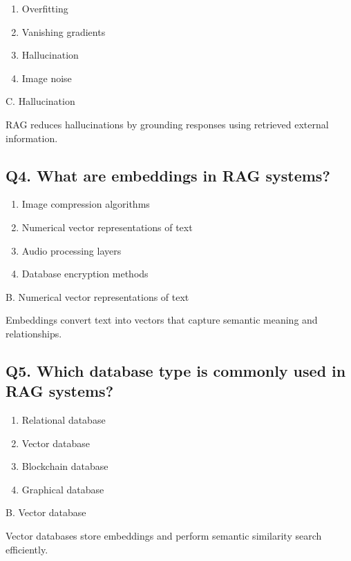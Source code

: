 \documentclass[12pt,a4paper]{article}
\begin{document}
\begin{enumerate}[label=\Alph*.]
\item Overfitting
\item Vanishing gradients
\item Hallucination
\item Image noise
\end{enumerate}

\begin{tcolorbox}[colback=mid,colframe=softblue,title=Correct Answer]
C. Hallucination

RAG reduces hallucinations by grounding responses using retrieved external information.
\end{tcolorbox}


\subsection*{Q4. What are embeddings in RAG systems?}

\begin{enumerate}[label=\Alph*.]
\item Image compression algorithms
\item Numerical vector representations of text
\item Audio processing layers
\item Database encryption methods
\end{enumerate}

\begin{tcolorbox}[colback=mid,colframe=softblue,title=Correct Answer]
B. Numerical vector representations of text

Embeddings convert text into vectors that capture semantic meaning and relationships.
\end{tcolorbox}


\subsection*{Q5. Which database type is commonly used in RAG systems?}

\begin{enumerate}[label=\Alph*.]
\item Relational database
\item Vector database
\item Blockchain database
\item Graphical database
\end{enumerate}

\begin{tcolorbox}[colback=mid,colframe=softblue,title=Correct Answer]
B. Vector database

Vector databases store embeddings and perform semantic similarity search efficiently.
\end{tcolorbox}
\end{document}
